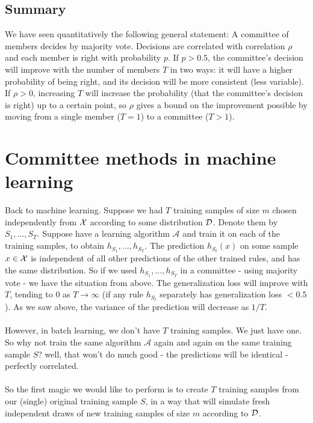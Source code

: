 \documentclass[11pt]{article}
\newcommand{\Ac}{\mathcal{A}}
\begin{document}
  \subsection{Summary}

We have seen quantitatively the following general statement:
A committee of members decides by majority vote. Decisions are correlated with
correlation $\rho$ and each member is right with probability $p$. If $p>0.5$,
the committee's decision will improve with the number of members $T$ in two
ways: it will have a higher probability of being right, and its decision will be more consistent (less
variable). If $\rho>0$, increasing $T$ will increase the probability (that the
committee's decision is right) up to a certain point, so
$\rho$ gives a bound on the improvement possible by moving from a single member
($T=1$)
to a committee ($T>1$).
  



  \section{Committee methods in machine learning}

  Back to machine learning. Suppose we had $T$ training samples of size $m$ chosen
independently from $\mathcal{X}$ according to some distribution $\mathcal{D}$. Denote them by 
$S_1,\ldots,S_T$.
Suppose have a learning algorithm $\Ac$ and train it on each of the training
samples, to obtain $h_{S_1},\ldots, h_{S_T}$. The prediction $h_{S_t}(x)$ on
some sample $x\in\mathcal{X}$ is independent of all other predictions of the other
trained rules, and has the same distribution. So if we used  $h_{S_1},\ldots,
h_{S_T}$ in a committee - using majority vote - we have the situation from above.
The generalization loss will improve with $T$, tending to $0$ as $T\to\infty$
(if any rule $h_{S_t}$ separately has generalization loss $<0.5$).
As we saw above, the variance of the prediction will decrease as $1/T$. 
\\~\\
However, in batch learning, we don't have $T$ training samples. We just have
one. So why not train the same algorithm $\Ac$ again and again on the same
training sample $S$? well, that won't do much good - the predictions will be
identical - perfectly
correlated. 
\\~\\
So the first magic we would like to perform is to create $T$ training samples from
our (single) original training sample $S$, in a way that will simulate fresh independent
draws of new training samples of size $m$ according to $\mathcal{D}$. 
\end{document}
